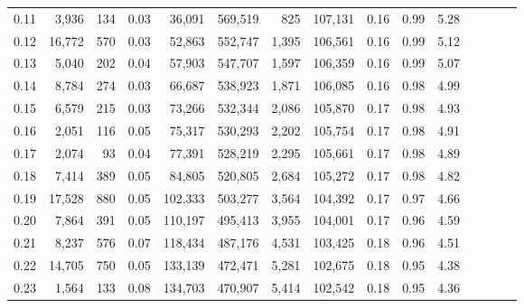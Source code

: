 \begin{tabular}{rrrcrrrrrrrrrrr}
0.11 &   3,936 &    134 &                                       0.03 &   36,091 &  569,519 &      825 &  107,131 &  0.16 &  0.99 &                         5.28 \\
0.12 &  16,772 &    570 &                                       0.03 &   52,863 &  552,747 &    1,395 &  106,561 &  0.16 &  0.99 &                         5.12 \\
0.13 &   5,040 &    202 &                                       0.04 &   57,903 &  547,707 &    1,597 &  106,359 &  0.16 &  0.99 &                         5.07 \\
0.14 &   8,784 &    274 &                                       0.03 &   66,687 &  538,923 &    1,871 &  106,085 &  0.16 &  0.98 &                         4.99 \\
0.15 &   6,579 &    215 &                                       0.03 &   73,266 &  532,344 &    2,086 &  105,870 &  0.17 &  0.98 &                         4.93 \\
0.16 &   2,051 &    116 &                                       0.05 &   75,317 &  530,293 &    2,202 &  105,754 &  0.17 &  0.98 &                         4.91 \\
0.17 &   2,074 &     93 &                                       0.04 &   77,391 &  528,219 &    2,295 &  105,661 &  0.17 &  0.98 &                         4.89 \\
0.18 &   7,414 &    389 &                                       0.05 &   84,805 &  520,805 &    2,684 &  105,272 &  0.17 &  0.98 &                         4.82 \\
0.19 &  17,528 &    880 &                                       0.05 &  102,333 &  503,277 &    3,564 &  104,392 &  0.17 &  0.97 &                         4.66 \\
0.20 &   7,864 &    391 &                                       0.05 &  110,197 &  495,413 &    3,955 &  104,001 &  0.17 &  0.96 &                         4.59 \\
0.21 &   8,237 &    576 &                                       0.07 &  118,434 &  487,176 &    4,531 &  103,425 &  0.18 &  0.96 &                         4.51 \\
0.22 &  14,705 &    750 &                                       0.05 &  133,139 &  472,471 &    5,281 &  102,675 &  0.18 &  0.95 &                         4.38 \\
0.23 &   1,564 &    133 &                                       0.08 &  134,703 &  470,907 &    5,414 &  102,542 &  0.18 &  0.95 &                         4.36 \\

\end{tabular}
